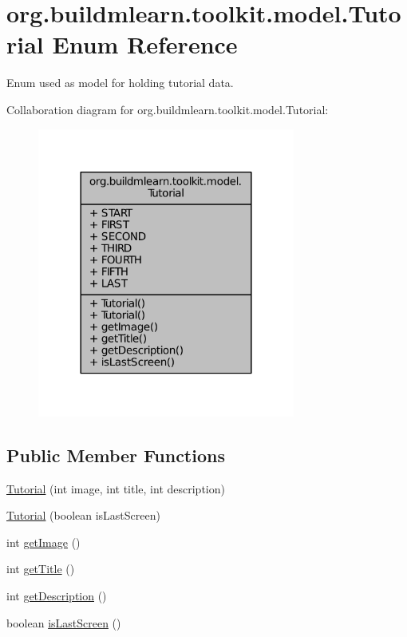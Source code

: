 \hypertarget{enumorg_1_1buildmlearn_1_1toolkit_1_1model_1_1Tutorial}{\section{org.\-buildmlearn.\-toolkit.\-model.\-Tutorial Enum Reference}
\label{enumorg_1_1buildmlearn_1_1toolkit_1_1model_1_1Tutorial}
}


Enum used as model for holding tutorial data.  




Collaboration diagram for org.\-buildmlearn.\-toolkit.\-model.\-Tutorial\-:
\nopagebreak
\begin{figure}[H]
\begin{center}
\leavevmode
\includegraphics[width=240pt]{d1/d1a/enumorg_1_1buildmlearn_1_1toolkit_1_1model_1_1Tutorial__coll__graph}
\end{center}
\end{figure}
\subsection*{Public Member Functions}
\begin{DoxyCompactItemize}
\item 
\hyperlink{enumorg_1_1buildmlearn_1_1toolkit_1_1model_1_1Tutorial_aebfb554db49a2a1136c01d58571ad64c}{Tutorial} (int image, int title, int description)
\item 
\hyperlink{enumorg_1_1buildmlearn_1_1toolkit_1_1model_1_1Tutorial_ac2bce108bcd8dbf3d56509e7985747a4}{Tutorial} (boolean is\-Last\-Screen)
\item 
int \hyperlink{enumorg_1_1buildmlearn_1_1toolkit_1_1model_1_1Tutorial_a579bb6f85a64016cf0332ab0a822a73b}{get\-Image} ()
\item 
int \hyperlink{enumorg_1_1buildmlearn_1_1toolkit_1_1model_1_1Tutorial_a09f932237280e91090c6eff580ac0ca7}{get\-Title} ()
\item 
int \hyperlink{enumorg_1_1buildmlearn_1_1toolkit_1_1model_1_1Tutorial_a78e34e62ed6799264a4d241d1cd522d6}{get\-Description} ()
\item 
boolean \hyperlink{enumorg_1_1buildmlearn_1_1toolkit_1_1model_1_1Tutorial_a1d5c768cd3cf821049aea352f6c07d00}{is\-Last\-Screen} ()
\end{DoxyCompactItemize}
